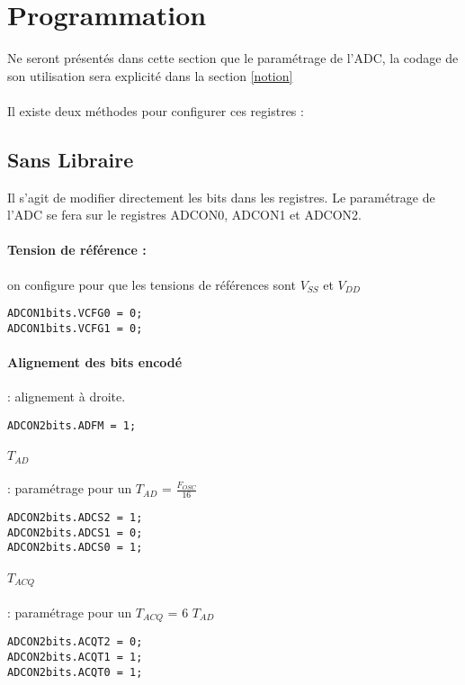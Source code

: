 \section{Programmation}
\label{programmation}
Ne seront présentés dans cette section que le paramétrage de l'ADC, la codage de son utilisation sera explicité dans la section \ref{notion}
\paragraph{}
Il existe deux méthodes pour configurer ces registres :

\subsection{Sans Libraire}
Il s'agit de modifier directement les bits dans les registres. Le paramétrage de l'ADC se fera sur le registres ADCON0, ADCON1 et ADCON2.

\paragraph{Tension de référence :} on configure pour que les tensions de références sont  $V_{SS}$ et $V_{DD}$


\begin{lstlisting}
ADCON1bits.VCFG0 = 0;
ADCON1bits.VCFG1 = 0;
\end{lstlisting}

\paragraph{Alignement des bits encodé} : alignement à droite.
\begin{lstlisting}
ADCON2bits.ADFM = 1;
\end{lstlisting}


\paragraph{$T_{AD}$} : paramétrage pour un $T_{AD}$ = $\frac{F_{OSC}}{16}$
\begin{lstlisting}
ADCON2bits.ADCS2 = 1;
ADCON2bits.ADCS1 = 0;
ADCON2bits.ADCS0 = 1;
\end{lstlisting}

\paragraph{$T_{ACQ}$} : paramétrage pour un $T_{ACQ}$ = 6 $T_{AD}$
\begin{lstlisting}
ADCON2bits.ACQT2 = 0;
ADCON2bits.ACQT1 = 1;
ADCON2bits.ACQT0 = 1;
\end{lstlisting}


